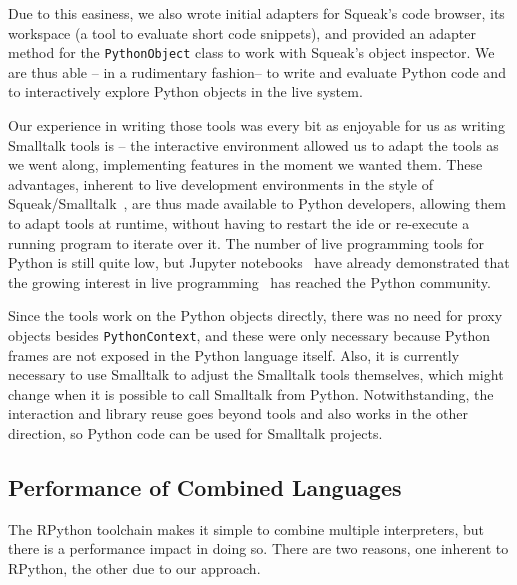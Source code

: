 \documentclass[sigconf,english]{acmart}
\newcommand{\ac}[1]{\gls*{#1}}
\newcommand*\Squeak{Squeak\slash Smalltalk\xspace}
\begin{document}


Due to this easiness, we also wrote initial adapters for Squeak's code browser,
its workspace (a tool to evaluate short code snippets), and provided an
adapter method for the \lstinline{PythonObject} class to work with Squeak's
object inspector. We are thus able \--- in a rudimentary fashion\--- to write
and evaluate Python code and to interactively explore Python objects in the
live system.

Our experience in writing those tools was every bit as enjoyable for us as
writing Smalltalk tools is \--- the interactive environment allowed us to adapt
the tools as we went along, implementing features in the moment we wanted them.
These advantages, inherent to live development environments in the style of
\Squeak~\cite{taeumel2012vivide}, are thus made available to Python developers,
allowing them to adapt tools at runtime, without having to restart the
\ac{ide} or re-execute a running program to iterate over it. The number of live
programming tools for Python is still quite low, but Jupyter
notebooks~\cite{ragan2014jupyter} have already demonstrated that the growing
interest in live programming~\cite{tanimoto2013perspective} has reached the
Python community.

Since the tools work on the Python objects directly, there was no need for proxy
objects besides \lstinline{PythonContext}, and these were only necessary because
Python frames are not exposed in the Python language itself. Also, it is
currently necessary to use Smalltalk to adjust the Smalltalk tools themselves,
which might change when it is possible to call Smalltalk from Python.
Notwithstanding, the interaction and library reuse goes beyond tools and also
works in the other direction, so Python code can be used for Smalltalk projects.

\subsection{Performance of Combined Languages}
The RPython toolchain makes it simple to combine multiple interpreters, but
there is a performance impact in doing so. There are two reasons, one inherent
to RPython, the other due to our approach.
\end{document}
